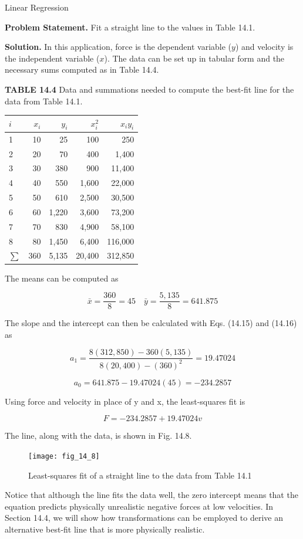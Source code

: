 \documentclass[../main.tex]{subfiles}
\begin{document}
\begin{example} Linear Regression
	
	\noindent \textbf{Problem Statement. } \quad  Fit a straight line to the values in Table 14.1.

	\noindent \textbf{Solution. } \quad   In this application, force is the dependent variable ($y$) and velocity is the
	independent variable ($x$). The data can be set up in tabular form and the necessary sums
	computed as in Table 14.4.

	\noindent \textbf{TABLE 14.4} \quad Data and summations needed to compute the best-fit line for the data
	from Table 14.1.

	\begin{tabular}{lrrrr}
		$i$ & $x_i$ & $y_i$ & $x^2_i$ & $x_i y_i$ \\
		\hline
		1 & 10 & 25 & 100 & 250 \\
		2 & 20 & 70 & 400 & 1,400 \\
		3 & 30 & 380 & 900 & 11,400 \\
		4 & 40 & 550 & 1,600 & 22,000 \\
		5 & 50 & 610 & 2,500 & 30,500 \\
		6 & 60 & 1,220 & 3,600 & 73,200 \\
		7 & 70 & 830 & 4,900 & 58,100 \\
		8 & 80 & 1,450 & 6,400 & 116,000 \\
		$\sum$ &360 & 5,135 & 20,400 & 312,850
	\end{tabular}

	The means can be computed as

	$$
		\bar{x} = \frac{360}{8} = 45 \quad \bar{y} = \frac{5,135}{8 } = 641.875
	$$

	\noindent The slope and the intercept can then be calculated with Eqs. (14.15) and (14.16) as

	$$
		a_1 = \frac{8(312,850) - 360(5,135)}{8(20,400) - (360)^2} = 19.47024
	$$

	$$
		a_0 = 641.875 - 19.47024(45) = -234.2857
	$$

	\noindent Using force and velocity in place of y and x, the least-squares fit is

	$$
	F = -234.2857 + 19.47024v
	$$

	\noindent The line, along with the data, is shown in Fig. 14.8.

	\begin{figure}[H]
		\centering
		\texttt{[image: fig\_14\_8]}
		\caption{\textsf{Least-squares fit of a straight line to the data from Table 14.1}}
		\label{fig:fig_14_8}
	\end{figure}

	Notice that although the line fits the data well, the zero intercept means that the equation predicts physically unrealistic negative forces at low velocities. In Section 14.4, we
will show how transformations can be employed to derive an alternative best-fit line that is
more physically realistic.

\end{example}
\end{document}
